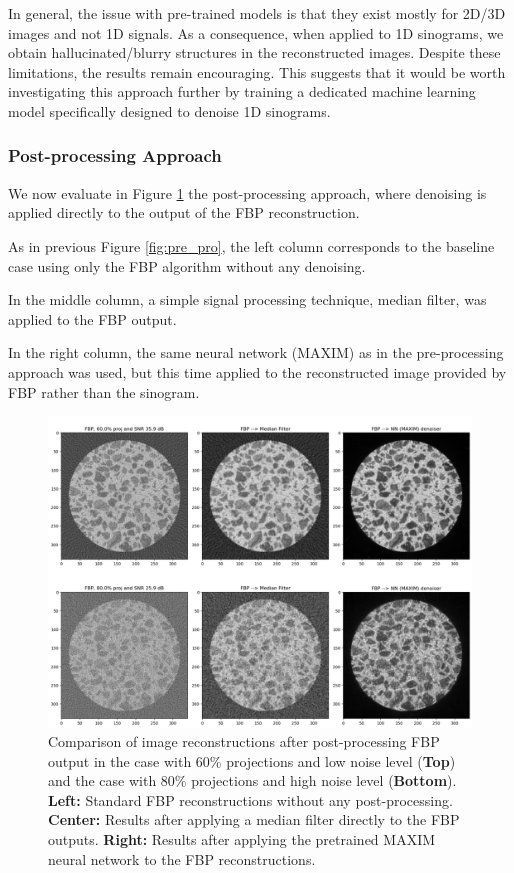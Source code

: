 \documentclass{article}
\begin{document}
In general, the issue with pre-trained models is that they exist mostly for 2D/3D images and not 1D signals. As a consequence, when applied to 1D sinograms, we obtain hallucinated/blurry structures in the reconstructed images. Despite these limitations, the results remain encouraging. This suggests that it would be worth investigating this approach further by training a dedicated machine learning model specifically designed to denoise 1D sinograms.

\subsubsection*{Post-processing Approach}
We now evaluate in Figure \ref{fig:post_pro} the post-processing approach, where denoising is applied directly to the output of the FBP reconstruction.

As in previous Figure \ref{fig:pre_pro}, the left column corresponds to the baseline case using only the FBP algorithm without any denoising.

In the middle column, a simple signal processing technique, median filter, was applied to the FBP output.

In the right column, the same neural network (MAXIM) as in the pre-processing approach was used, but this time applied to the reconstructed image provided by FBP rather than the sinogram.

\begin{figure}[H]
    \centering
    \includegraphics[scale=0.85]{figures/post_pro.png}
    \caption{Comparison of image reconstructions after post-processing FBP output in the case with 60\% projections and low noise level (\textbf{Top}) and the case with 80\% projections and high noise level (\textbf{Bottom}).
\textbf{Left:} Standard FBP reconstructions without any post-processing.
\textbf{Center:} Results after applying a median filter directly to the FBP outputs.
\textbf{Right:} Results after applying the pretrained MAXIM neural network to the FBP reconstructions.}
    \label{fig:post_pro}
\end{figure}
\end{document}

